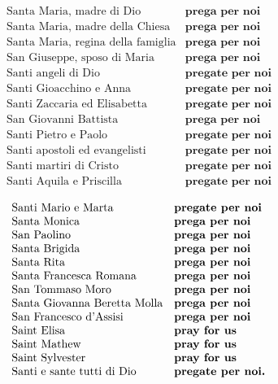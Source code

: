 \[\begin{array}{ll}
\textrm{Santa Maria, madre di Dio} & \textbf{prega per noi}\\
\textrm{Santa Maria, madre della Chiesa} & \textbf{prega per noi}\\
\textrm{Santa Maria, regina della famiglia} & \textbf{prega per noi}\\
\textrm{San Giuseppe, sposo di Maria} & \textbf{prega per noi}\\
\textrm{Santi angeli di Dio} & \textbf{pregate per noi}\\
\textrm{Santi Gioacchino e Anna} & \textbf{pregate per noi}\\
\textrm{Santi Zaccaria ed Elisabetta} & \textbf{pregate per noi}\\
\textrm{San Giovanni Battista} & \textbf{prega per noi}\\
\textrm{Santi Pietro e Paolo} & \textbf{pregate per noi}\\
\textrm{Santi apostoli ed evangelisti} & \textbf{pregate per noi}\\
\textrm{Santi martiri di Cristo} & \textbf{pregate per noi}\\
\textrm{Santi Aquila e Priscilla} & \textbf{pregate per noi}\\
\end{array}\]
\[\begin{array}{ll}
\textrm{Santi Mario e Marta} & \textbf{pregate per noi}\\
\textrm{Santa Monica} & \textbf{prega per noi}\\
\textrm{San Paolino} & \textbf{prega per noi}\\
\textrm{Santa Brigida} & \textbf{prega per noi}\\
\textrm{Santa Rita} & \textbf{prega per noi}\\
\textrm{Santa Francesca Romana} & \textbf{prega per noi}\\
\textrm{San Tommaso Moro} & \textbf{prega per noi}\\
\textrm{Santa Giovanna Beretta Molla} & \textbf{prega per noi}\\
\textrm{San Francesco d'Assisi} & \textbf{prega per noi}\\
\textrm{Saint Elisa} & \textbf{pray for us}\\
\textrm{Saint Mathew} & \textbf{pray for us}\\
\textrm{Saint Sylvester} & \textbf{pray for us}\\
\textrm{Santi e sante tutti di Dio} & \textbf{pregate per noi.}\\
\end{array}\]


